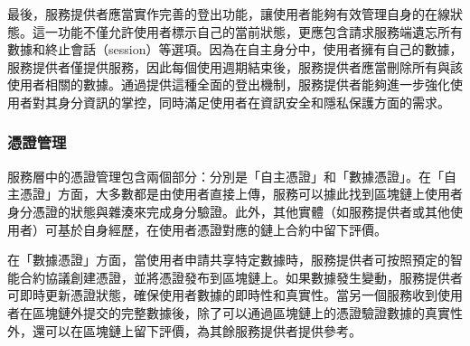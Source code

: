 最後，服務提供者應當實作完善的登出功能，讓使用者能夠有效管理自身的在線狀態。這一功能不僅允許使用者標示自己的當前狀態，更應包含請求服務端遺忘所有數據和終止會話（session）等選項。因為在自主身分中，使用者擁有自己的數據，服務提供者僅提供服務，因此每個使用週期結束後，服務提供者應當刪除所有與該使用者相關的數據。通過提供這種全面的登出機制，服務提供者能夠進一步強化使用者對其身分資訊的掌控，同時滿足使用者在資訊安全和隱私保護方面的需求。
\subsubsection{憑證管理}
服務層中的憑證管理包含兩個部分：分別是「自主憑證」和「數據憑證」。在「自主憑證」方面，大多數都是由使用者直接上傳，服務可以據此找到區塊鏈上使用者身分憑證的狀態與雜湊來完成身分驗證。此外，其他實體（如服務提供者或其他使用者）可基於自身經歷，在使用者憑證對應的鏈上合約中留下評價。

在「數據憑證」方面，當使用者申請共享特定數據時，服務提供者可按照預定的智能合約協議創建憑證，並將憑證發布到區塊鏈上。如果數據發生變動，服務提供者可即時更新憑證狀態，確保使用者數據的即時性和真實性。當另一個服務收到使用者在區塊鏈外提交的完整數據後，除了可以通過區塊鏈上的憑證驗證數據的真實性外，還可以在區塊鏈上留下評價，為其餘服務提供者提供參考。
